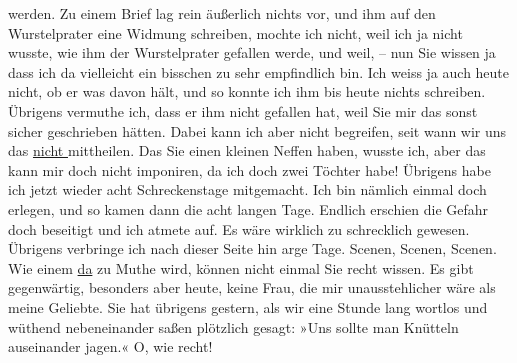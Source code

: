 \begin{ledgroupsized}[t]{13cm}
               werden. Zu einem Brief lag rein äußerlich nichts vor, und ihm auf den Wurstelprater eine Widmung schreiben, mochte ich nicht, weil
               ich ja nicht wusste, wie ihm der Wurstelprater
               gefallen werde, und weil, – nun Sie wissen ja dass ich da vielleicht ein bisschen zu
               sehr empfindlich bin. Ich weiss ja auch heute nicht, ob er was davon hält, und so
               konnte ich ihm bis heute nichts schreiben. Übrigens vermuthe ich, dass er ihm nicht
               gefallen hat, weil Sie mir das sonst sicher geschrieben hätten. Dabei kann ich aber
               nicht begreifen, {\pb}seit wann
               wir uns das \uline{nicht }mittheilen. Das Sie einen kleinen
               Neffen haben, wusste ich, aber das
               kann mir doch nicht imponiren, da ich doch zwei Töchter habe! Übrigens habe ich
               jetzt wieder acht Schreckenstage mitgemacht. Ich bin nämlich einmal doch erlegen, und
               so kamen dann die acht langen Tage. Endlich erschien die Gefahr doch beseitigt und
               ich atmete auf. Es wäre wirklich zu schrecklich gewesen. Übrigens verbringe ich nach
               dieser Seite hin arge Tage. Scenen, Scenen, Scenen. Wie einem \uline{da} zu Muthe wird, können nicht einmal Sie recht wissen. Es gibt
               gegenwärtig, besonders aber heute, keine Frau, die mir unausstehlicher wäre als meine
                  Geliebte.
               Sie hat übrigens gestern, als wir eine Stunde lang wortlos und wüthend nebeneinander
               saßen plötzlich gesagt: »Uns sollte man Knütteln auseinander jagen.« O, wie recht!

\end{ledgroupsized}
